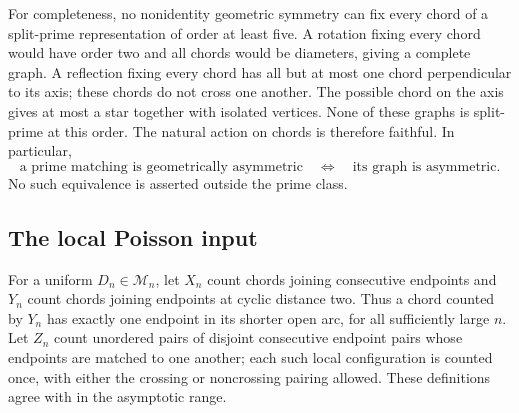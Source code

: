 \documentclass[11pt,letterpaper]{article}
\numberwithin{equation}{section}
\theoremstyle{definition}\newtheorem{definition}[theorem]{Definition}
\theoremstyle{remark}\newtheorem{remark}[theorem]{Remark}
\begin{document}
For completeness, no nonidentity geometric symmetry can fix every
chord of a split-prime representation of order at least five. A
rotation fixing every chord would have order two and all chords
would be diameters, giving a complete graph. A reflection fixing
every chord has all but at most one chord perpendicular to its
axis; these chords do not cross one another. The possible chord on
the axis gives at most a star together with isolated vertices. None
of these graphs is split-prime at this order. The natural action on
chords is therefore faithful. In particular,
\begin{equation}\label{cgr:ld:eq:prime-asym}
 \text{a prime matching is geometrically asymmetric}
 \quad\Longleftrightarrow\quad
 \text{its graph is asymmetric}.
\end{equation}
No such equivalence is asserted outside the prime class.

\subsection{The local Poisson input}\label{cgr:ld:sub:poisson}
For a uniform $D_n\in\mathcal M_n$, let $X_n$ count chords joining
consecutive endpoints and $Y_n$ count chords joining endpoints at
cyclic distance two. Thus a chord counted by $Y_n$ has exactly one
endpoint in its shorter open arc, for all sufficiently large $n$.
Let $Z_n$ count unordered pairs of disjoint consecutive endpoint
pairs whose endpoints are matched to one another; each such local
configuration is counted once, with either the crossing or
noncrossing pairing allowed. These definitions agree with
\cite[Section 5.2.4]{BBFGP24} in the asymptotic range.
\end{document}
